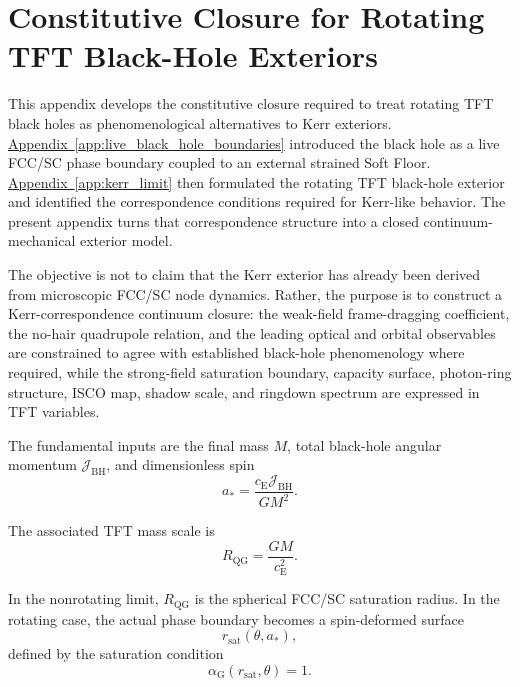 \chapter{Constitutive Closure for Rotating TFT Black-Hole Exteriors}
\label{app:bh_rotating_kerr_clouser}

This appendix develops the constitutive closure required to treat rotating TFT black holes as phenomenological alternatives to Kerr exteriors. \hyperref[app:live_black_hole_boundaries]{Appendix~\ref*{app:live_black_hole_boundaries}} introduced the black hole as a live FCC/SC phase boundary coupled to an external strained Soft Floor. \hyperref[app:kerr_limit]{Appendix~\ref*{app:kerr_limit}} then formulated the rotating TFT black-hole exterior and identified the correspondence conditions required for Kerr-like behavior. The present appendix turns that correspondence structure into a closed continuum-mechanical exterior model.

The objective is not to claim that the Kerr exterior has already been derived from microscopic FCC/SC node dynamics. Rather, the purpose is to construct a Kerr-correspondence continuum closure: the weak-field frame-dragging coefficient, the no-hair quadrupole relation, and the leading optical and orbital observables are constrained to agree with established black-hole phenomenology where required, while the strong-field saturation boundary, capacity surface, photon-ring structure, ISCO map, shadow scale, and ringdown spectrum are expressed in TFT variables.

The fundamental inputs are the final mass $M$, total black-hole angular momentum $\mathcal{J}_{\mathrm{BH}}$, and dimensionless spin
\begin{equation}
    a_\ast = \frac{c_{\mathrm{E}}\mathcal{J}_{\mathrm{BH}}}{GM^2}.
\end{equation}

The associated TFT mass scale is
\begin{equation}
    R_{\mathrm{QG}} = \frac{GM}{c_{\mathrm{E}}^2}.
\end{equation}

In the nonrotating limit, $R_{\mathrm{QG}}$ is the spherical FCC/SC saturation radius. In the rotating case, the actual phase boundary becomes a spin-deformed surface
\begin{equation}
    r_{\mathrm{sat}}(\theta,a_\ast),
\end{equation}
defined by the saturation condition
\begin{equation}
    \alpha_{\mathrm{G}}(r_{\mathrm{sat}},\theta) = 1.
\end{equation}

